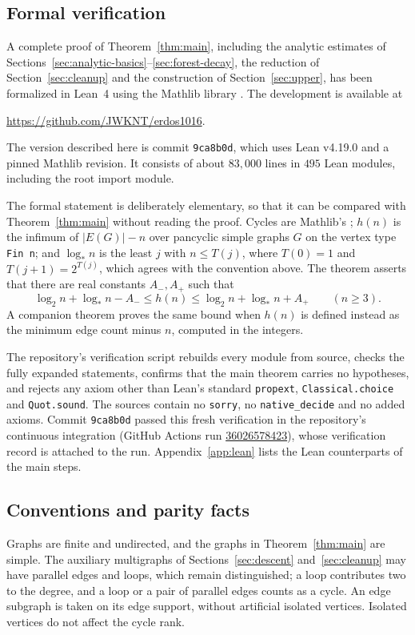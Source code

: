 \documentclass[11pt,a4paper]{article}
\numberwithin{equation}{section}
\theoremstyle{definition}
\theoremstyle{remark}
\newcommand{\lstar}{\log_*}
\begin{document}
\subsection{Formal verification}\label{sec:lean}
A complete proof of Theorem~\ref{thm:main}, including the analytic estimates of Sections~\ref{sec:analytic-basics}--\ref{sec:forest-decay}, the reduction of Section~\ref{sec:cleanup} and the construction of Section~\ref{sec:upper}, has been formalized in Lean~4 \cite{Lean4} using the Mathlib library \cite{Mathlib}. The development is available at
\begin{center}
\url{https://github.com/JWKNT/erdos1016}.
\end{center}
The version described here is commit \texttt{9ca8b0d}, which uses Lean v4.19.0 and a pinned Mathlib revision. It consists of about $83{,}000$ lines in $495$ Lean modules, including the root import module.

The formal statement is deliberately elementary, so that it can be compared with Theorem~\ref{thm:main} without reading the proof. Cycles are Mathlib's ; $h(n)$ is the infimum of $|E(G)|-n$ over pancyclic simple graphs $G$ on the vertex type \texttt{Fin n}; and $\lstar n$ is the least $j$ with $n\le T(j)$, where $T(0)=1$ and $T(j+1)=2^{T(j)}$, which agrees with the convention above. The theorem  asserts that there are real constants $A_-,A_+$ such that
\[
 \log_2n+\lstar n-A_-\le h(n)\le\log_2n+\lstar n+A_+\qquad(n\ge3).
\]
A companion theorem proves the same bound when $h(n)$ is defined instead as the minimum edge count minus $n$, computed in the integers.

The repository's verification script rebuilds every module from source, checks the fully expanded statements, confirms that the main theorem carries no hypotheses, and rejects any axiom other than Lean's standard \texttt{propext}, \texttt{Classical.choice} and \texttt{Quot.sound}. The sources contain no \texttt{sorry}, no \texttt{native\_decide} and no added axioms. Commit \texttt{9ca8b0d} passed this fresh verification in the repository's continuous integration (GitHub Actions run \href{https://github.com/JWKNT/erdos1016/actions/runs/36026578423}{36026578423}), whose verification record is attached to the run. Appendix~\ref{app:lean} lists the Lean counterparts of the main steps.

\subsection{Conventions and parity facts}\label{sec:parity}
Graphs are finite and undirected, and the graphs in Theorem~\ref{thm:main} are simple. The auxiliary multigraphs of Sections~\ref{sec:descent} and~\ref{sec:cleanup} may have parallel edges and loops, which remain distinguished; a loop contributes two to the degree, and a loop or a pair of parallel edges counts as a cycle. An edge subgraph is taken on its edge support, without artificial isolated vertices. Isolated vertices do not affect the cycle rank.
\end{document}

